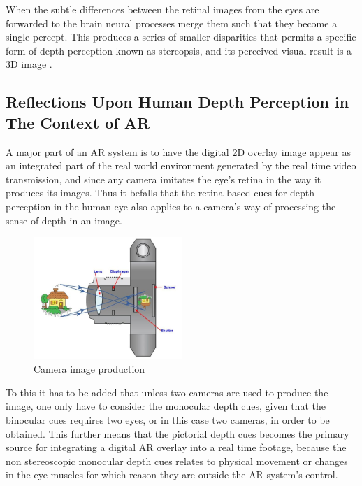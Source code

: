 When the subtle differences between the retinal images from the eyes are forwarded to the brain neural processes merge them such that they become a single percept. This produces a series of smaller disparities that permits a specific form of depth perception known as stereopsis, and its perceived visual result is a 3D image \cite{Parker2007}.

\subsection{Reflections Upon Human Depth Perception in The Context of AR}
A major part of an AR system is to have the digital 2D overlay image appear as an integrated part of the real world environment generated by the real time video transmission, and since any camera imitates the eye’s retina in the way it produces its images. Thus it befalls that the retina based cues for depth perception in the human eye also applies to a camera’s way of processing the sense of depth in an image.

\begin{figure}[h!]
   \centering
   \includegraphics[width=0.5\textwidth]{figures/camera.jpg}
   \caption{Camera image production \cite{Camera}}\label{fig:camera}
\end{figure}

To this it has to be added that unless two cameras are used to produce the image, one only have to consider the monocular depth cues, given that the binocular cues requires two eyes, or in this case two cameras, in order to be obtained. This further means that the pictorial depth cues becomes the primary source for integrating a digital AR overlay into a real time footage, because the non stereoscopic monocular depth cues relates to physical movement or changes in the eye muscles for which reason they are outside the AR system’s control.

